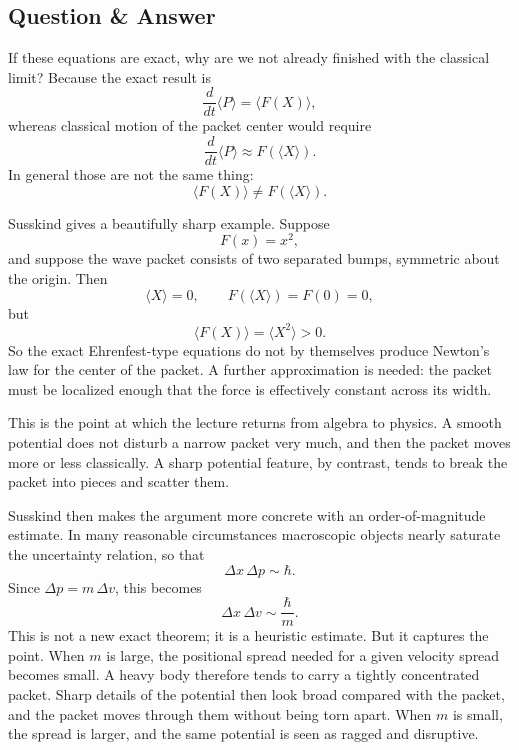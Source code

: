 \subsection{Question \& Answer}

If these equations are exact, why are we not already finished with the classical limit? Because the exact result is
\begin{equation}
\frac{d}{dt}\langle P\rangle=\langle F(X)\rangle,
\end{equation}
whereas classical motion of the packet center would require
\begin{equation}
\frac{d}{dt}\langle P\rangle\approx F(\langle X\rangle).
\end{equation}
In general those are not the same thing:
\begin{equation}
\langle F(X)\rangle \neq F(\langle X\rangle).
\end{equation}

Susskind gives a beautifully sharp example. Suppose
\begin{equation}
F(x)=x^2,
\end{equation}
and suppose the wave packet consists of two separated bumps, symmetric about the origin. Then
\begin{equation}
\langle X\rangle=0,
\qquad
F(\langle X\rangle)=F(0)=0,
\end{equation}
but
\begin{equation}
\langle F(X)\rangle=\langle X^2\rangle>0.
\end{equation}
So the exact Ehrenfest-type equations do not by themselves produce Newton's law for the center of the packet. A further approximation is needed: the packet must be localized enough that the force is effectively constant across its width.

This is the point at which the lecture returns from algebra to physics. A smooth potential does not disturb a narrow packet very much, and then the packet moves more or less classically. A sharp potential feature, by contrast, tends to break the packet into pieces and scatter them.

Susskind then makes the argument more concrete with an order-of-magnitude estimate. In many reasonable circumstances macroscopic objects nearly saturate the uncertainty relation, so that
\begin{equation}
\Delta x\,\Delta p \sim \hbar.
\end{equation}
Since \(\Delta p=m\,\Delta v\), this becomes
\begin{equation}
\Delta x\,\Delta v \sim \frac{\hbar}{m}.
\end{equation}
This is not a new exact theorem; it is a heuristic estimate. But it captures the point. When \(m\) is large, the positional spread needed for a given velocity spread becomes small. A heavy body therefore tends to carry a tightly concentrated packet. Sharp details of the potential then look broad compared with the packet, and the packet moves through them without being torn apart. When \(m\) is small, the spread is larger, and the same potential is seen as ragged and disruptive.

